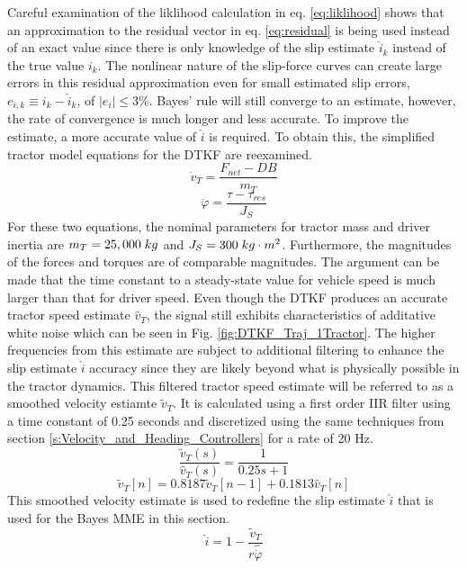 Careful examination of the liklihood calculation in eq. \ref{eq:liklihood} shows that an approximation to the residual vector in eq. \ref{eq:residual} is being used instead of an exact value since there is only knowledge of the slip estimate $\hat{i}_k$ instead of the true value $i_k$. The nonlinear nature of the slip-force curves can create large errors in this residual approximation even for small estimated slip errors, $e_{i,k} \equiv i_k - \hat{i}_k$, of $|e_i| \leq 3\%$. Bayes' rule will still converge to an estimate, however, the rate of convergence is much longer and less accurate. To improve the estimate, a more accurate value of $\hat{i}$ is required. To obtain this, the simplified tractor model equations for the DTKF are reexamined. 
\begin{equation*}
    \dot v_T = \frac{F_{net}-DB}{m_T}
\end{equation*}
\begin{equation*}
    \ddot \varphi = \frac{\tau - \tau_{res}}{J_S}
\end{equation*}
For these two equations, the nominal parameters for tractor mass and driver inertia are $m_T = 25,000\hspace{1mm}kg$ and $J_S = 300\hspace{1mm}kg\cdot m^2$. Furthermore, the magnitudes of the forces and torques are of comparable magnitudes. The argument can be made that the time constant to a steady-state value for vehicle speed is much larger than that for driver speed. Even though the DTKF produces an accurate tractor speed estimate $\hat{v}_T$, the signal still exhibits characteristics of additative white noise which can be seen in Fig. \ref{fig:DTKF_Traj_1Tractor}. The higher frequencies from this estimate are subject to additional filtering to enhance the slip estimate $\hat{i}$ accuracy since they are likely beyond what is physically possible in the tractor dynamics. This filtered tractor speed estimate will be referred to as a smoothed velocity estiamte $\tilde v_T$. It is calculated using a first order IIR filter using a time constant of 0.25 seconds and discretized using the same techniques from section \ref{s:Velocity_and_Heading_Controllers} for a rate of 20 Hz.
\begin{equation}
    \frac{\tilde v_T(s)}{\hat{v}_T(s)} = \frac{1}{0.25s + 1}
\end{equation}
\begin{equation}
    \tilde{v}_T[n] = 0.8187\tilde{v}_T[n-1]  + 0.1813\hat{v}_T[n]
\end{equation}
This smoothed velocity estimate is used to redefine the slip estimate $\hat{i}$ that is used for the Bayes MME in this section. 
\begin{equation}
    \hat{i} = 1 - \frac{\tilde v_T}{r\hat{\dot\varphi}}
\end{equation}
